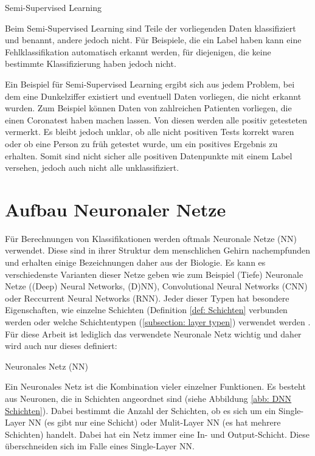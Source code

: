 \begin{definition}
	\label{def: Semi-Supervised}
	Semi-Supervised Learning
	
	Beim Semi-Supervised Learning sind Teile der vorliegenden Daten klassifiziert und benannt, andere jedoch nicht. Für Beispiele, die ein Label haben kann eine Fehlklassifikation automatisch erkannt werden, für diejenigen, die keine bestimmte Klassifizierung haben jedoch nicht. \cite{Basics-(un/semi)supervised}
	
	Ein Beispiel für Semi-Supervised Learning ergibt sich aus jedem Problem, bei dem eine Dunkelziffer existiert und eventuell Daten vorliegen, die nicht erkannt wurden. Zum Beispiel können Daten von zahlreichen Patienten vorliegen, die einen Coronatest haben machen lassen. Von diesen werden alle positiv getesteten vermerkt. Es bleibt jedoch unklar, ob alle nicht positiven Tests korrekt waren oder ob eine Person zu früh getestet wurde, um ein positives Ergebnis zu erhalten. Somit sind nicht sicher alle positiven Datenpunkte mit einem Label versehen, jedoch auch nicht alle unklassifiziert.
\end{definition}

\section{Aufbau Neuronaler Netze}
\label{section: NN}
Für Berechnungen von Klassifikationen werden oftmals Neuronale Netze (NN) verwendet. Diese sind in ihrer Struktur dem menschlichen Gehirn nachempfunden und erhalten einige Bezeichnungen daher aus der Biologie. \cite{Basics-ANN-NN-RNN}  Es kann es verschiedenste Varianten dieser Netze geben wie zum Beispiel (Tiefe) Neuronale Netze ((Deep) Neural Networks, (D)NN), Convolutional Neural Networks (CNN) oder Reccurrent Neural Networks (RNN). Jeder dieser Typen hat besondere Eigenschaften, wie einzelne Schichten (Definition \ref{def: Schichten} verbunden werden oder welche Schichtentypen (\ref{subsection: layer typen}) verwendet werden \cite{Basics-ANN-NN-RNN, Basics-CNN}. Für diese Arbeit ist lediglich das verwendete Neuronale Netz wichtig und daher wird auch nur dieses definiert: 

\begin{definition}
	\label{def: NN}
	Neuronales Netz (NN)
	
	Ein Neuronales Netz ist die Kombination vieler einzelner Funktionen. Es besteht aus Neuronen, die in Schichten angeordnet sind (siehe Abbildung \ref{abb: DNN Schichten}). Dabei bestimmt die Anzahl der Schichten, ob es sich um ein Single-Layer NN (es gibt nur eine Schicht) oder Mulit-Layer NN (es hat mehrere Schichten) handelt. Dabei hat ein Netz immer eine In- und Output-Schicht. Diese überschneiden sich im Falle eines Single-Layer NN. \cite{Goodfellow-et-al-2016 ??, Basics-ANN-NN-RNN}
\end{definition}

